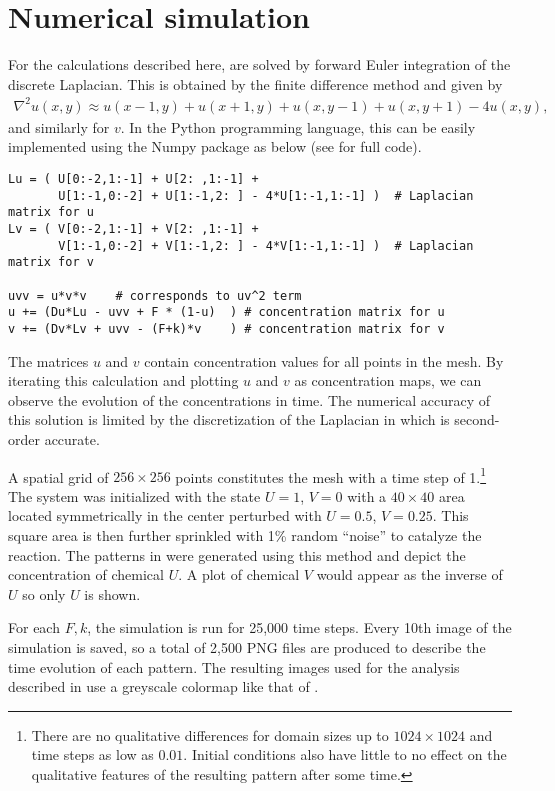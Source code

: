 \section{Numerical simulation} \label{ch1:gs-simulation}

For the calculations described here,  are solved by forward Euler integration of the discrete Laplacian. This is obtained by the finite difference method and given by
	\begin{align}\label{eq:laplacian}
		\nabla^2 u(x,y) \approx u(x-1, y) + u(x+1, y) + u(x, y-1) + u(x, y+1) - 4 u(x, y),
	\end{align}
and similarly for $v$. In the Python programming language, this can be easily implemented using the Numpy package as below (see  for full code).
%
\begin{Verbatim}[fontsize=\footnotesize,frame=leftline,framesep=5mm]
Lu = ( U[0:-2,1:-1] + U[2: ,1:-1] + 
       U[1:-1,0:-2] + U[1:-1,2: ] - 4*U[1:-1,1:-1] )  # Laplacian matrix for u
Lv = ( V[0:-2,1:-1] + V[2: ,1:-1] + 
       V[1:-1,0:-2] + V[1:-1,2: ] - 4*V[1:-1,1:-1] )  # Laplacian matrix for v

uvv = u*v*v    # corresponds to uv^2 term
u += (Du*Lu - uvv + F * (1-u)  ) # concentration matrix for u
v += (Dv*Lv + uvv - (F+k)*v    ) # concentration matrix for v
\end{Verbatim}
%
The matrices $u$ and $v$ contain concentration values for all points in the mesh. By iterating this calculation and plotting $u$ and $v$ as concentration maps, we can observe the evolution of the concentrations in time. The numerical accuracy of this solution is limited by the discretization of the Laplacian in  which is second-order accurate.

A spatial grid of $256 \times 256$ points constitutes the mesh with a time step of 1.\footnote{There are no qualitative differences for domain sizes up to $1024 \times 1024$ and time steps as low as $0.01$. Initial conditions also have little to no effect on the qualitative features of the resulting pattern after some time.} The system was initialized with the state $U=1$, $V=0$ with a $40 \times 40$ area located symmetrically in the center perturbed with $U=0.5$, $V=0.25$. This square area is then further sprinkled with 1\% random ``noise'' to catalyze the reaction. The patterns in  were generated using this method and depict the concentration of chemical $U$. A plot of chemical $V$ would appear as the inverse of $U$ so only $U$ is shown.

For each $F, k$, the simulation is run for 25,000 time steps. Every 10th image of the simulation is saved, so a total of 2,500 PNG files are produced to describe the time evolution of each pattern. The resulting images used for the analysis described in  use a greyscale colormap like that of .



